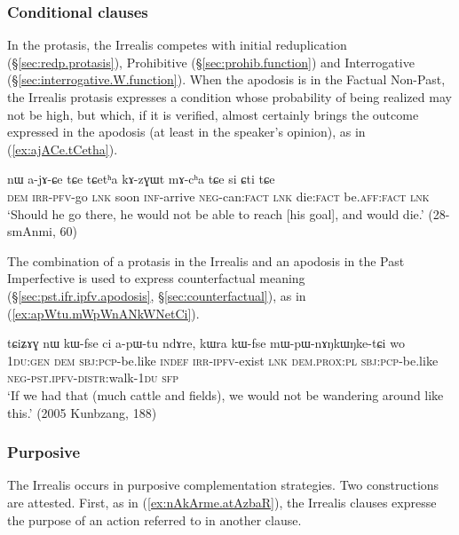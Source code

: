\subsubsection{Conditional clauses} \label{sec:irrealis.conditional}
In the protasis, the Irrealis competes with initial reduplication (§\ref{sec:redp.protasis}), Prohibitive (§\ref{sec:prohib.function}) and Interrogative (§\ref{sec:interrogative.W.function}). When the apodosis is in the Factual Non-Past, the Irrealis protasis expresses a condition whose probability of being realized may not be high, but which, if it is verified, almost certainly brings the outcome expressed in the apodosis (at least in the speaker's opinion), as in (\ref{ex:ajACe.tCetha}).

\begin{exe}
\ex \label{ex:ajACe.tCetha}
\gll nɯ a-jɤ-ɕe tɕe tɕetʰa kɤ-zɣɯt mɤ-cʰa tɕe si ɕti tɕe \\
\textsc{dem} \textsc{irr}-\textsc{pfv}-go \textsc{lnk} soon \textsc{inf}-arrive \textsc{neg}-can:\textsc{fact} \textsc{lnk} die:\textsc{fact} be.\textsc{aff}:\textsc{fact} \textsc{lnk} \\
\glt `Should he go there, he would not be able to reach [his goal], and would die.' (28-smAnmi, 60)
\end{exe}

The combination of a protasis in the Irrealis and an apodosis in the Past Imperfective is used to express counterfactual meaning (§\ref{sec:pst.ifr.ipfv.apodosis}, §\ref{sec:counterfactual}), as in (\ref{ex:apWtu.mWpWnANkWNetCi}).

\begin{exe}
\ex \label{ex:apWtu.mWpWnANkWNetCi}
\gll tɕiʑɤɣ nɯ kɯ-fse ci a-pɯ-tu ndɤre, kɯra kɯ-fse mɯ-pɯ-nɤŋkɯŋke-tɕi wo \\
\textsc{1du}:\textsc{gen} \textsc{dem} \textsc{sbj}:\textsc{pcp}-be.like \textsc{indef} \textsc{irr}-\textsc{ipfv}-exist \textsc{lnk} \textsc{dem}.\textsc{prox}:\textsc{pl} \textsc{sbj}:\textsc{pcp}-be.like \textsc{neg}-\textsc{pst}.\textsc{ipfv}-\textsc{distr}:walk-\textsc{1du} \textsc{sfp} \\
\glt `If we had that (much cattle and fields), we would not be wandering around like this.' (2005 Kunbzang, 188)
\end{exe}


\subsubsection{Purposive} \label{sec:irrealis.purposive}
The Irrealis occurs in purposive complementation strategies. Two constructions are attested. First, as in (\ref{ex:nAkArme.atAzbaR}), the Irrealis clauses expresse the purpose of an action referred to in another clause.


